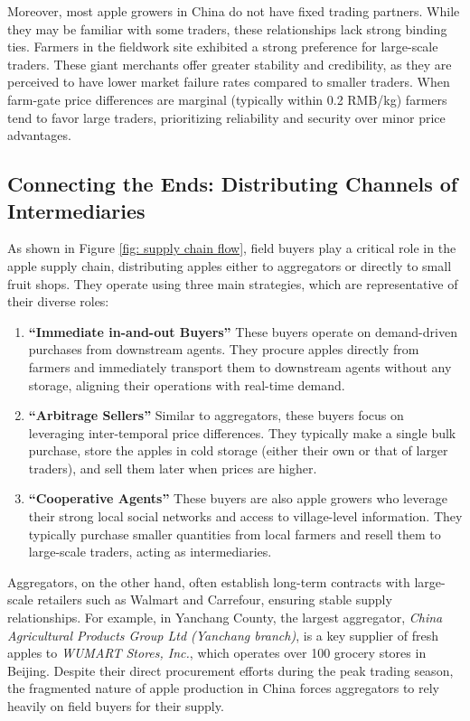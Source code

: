 Moreover, most apple growers in China do not have fixed trading partners. While they may be familiar with some traders, these relationships lack strong binding ties. Farmers in the fieldwork site exhibited a strong preference for large-scale traders. These giant merchants offer greater stability and credibility, as they are perceived to have lower market failure rates compared to smaller traders. When farm-gate price differences are marginal (typically within 0.2 RMB/kg) farmers tend to favor large traders, prioritizing reliability and security over minor price advantages.




\subsection{Connecting the Ends: Distributing Channels of Intermediaries}
\noindent As shown in Figure \ref{fig: supply chain flow}, field buyers play a critical role in the apple supply chain, distributing apples either to aggregators or directly to small fruit shops. They operate using three main strategies, which are representative of their diverse roles:

\begin{enumerate}
    \item \textbf{``Immediate in-and-out Buyers''} These buyers operate on demand-driven purchases from downstream agents. They procure apples directly from farmers and immediately transport them to downstream agents without any storage, aligning their operations with real-time demand.

    \item \textbf{``Arbitrage Sellers''} Similar to aggregators, these buyers focus on leveraging inter-temporal price differences. They typically make a single bulk purchase, store the apples in cold storage (either their own or that of larger traders), and sell them later when prices are higher.

    \item \textbf{``Cooperative Agents''} These buyers are also apple growers who leverage their strong local social networks and access to village-level information. They typically purchase smaller quantities from local farmers and resell them to large-scale traders, acting as intermediaries.
\end{enumerate}

Aggregators, on the other hand, often establish long-term contracts with large-scale retailers such as Walmart and Carrefour, ensuring stable supply relationships. For example, in Yanchang County, the largest aggregator, \textit{China Agricultural Products Group Ltd (Yanchang branch)}, is a key supplier of fresh apples to \textit{WUMART Stores, Inc.}, which operates over 100 grocery stores in Beijing. Despite their direct procurement efforts during the peak trading season, the fragmented nature of apple production in China forces aggregators to rely heavily on field buyers for their supply.

